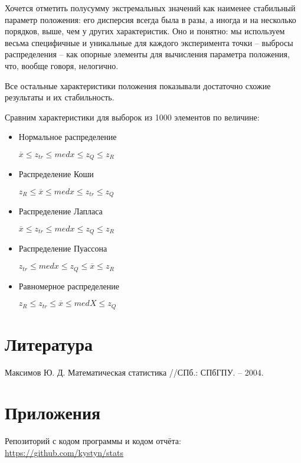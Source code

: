 Хочется отметить полусумму экстремальных значений как наименее стабильный параметр положения: его дисперсия всегда была в разы, а иногда и на несколько порядков, выше, чем у других характеристик. Оно и понятно: мы используем весьма специфичные и уникальные для каждого эксперимента точки -- выбросы распределения -- как опорные элементы для вычисления параметра положения, что, вообще говоря, нелогично.

Все остальные характеристики положения показывали достаточно схожие результаты и их стабильность.

Сравним характеристики для выборок из 1000 элементов по величине:
\begin{itemize}
	\item Нормальное распределение
	
	$\overline{x} \leq z_{tr} \leq med{x} \leq z_Q \leq z_R $
	
	\item Распределение Коши
	
	$z_R \leq \overline{x} \leq med{x} \leq z_{tr} \leq z_Q $
	
	\item Распределение Лапласа
	
	$ \overline{x} \leq z_{tr} \leq med{x} \leq z_Q \leq z_R $
	
	\item Распределение Пуассона
	
	$ z_{tr} \leq med{x} \leq z_Q \leq \overline{x} \leq z_R $
	
	\item Равномерное распределение
	
	$ z_R \leq z_{tr} \leq \overline{x} \leq med{X} \leq z_Q $
	
\end{itemize}

\section{Литература}
Максимов Ю. Д. Математическая статистика //СПб.: СПбГПУ. – 2004.

\section{Приложения}

Репозиторий с кодом программы и кодом отчёта: \href{https://github.com/kystyn/stats}{https://github.com/kystyn/stats}



